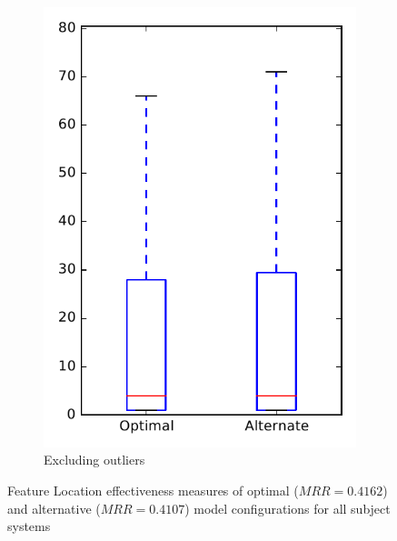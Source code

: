 \begin{figure}
\begin{subfigure}{.4\textwidth}
        \includegraphics[height=0.4\textheight]{figures/combo/flt_rq1_all_no_outlier}
        \caption{Excluding outliers}\label{fig:combo:flt:rq1:all_no_outlier}
    \end{subfigure}
\caption{Feature Location effectiveness measures of optimal ($MRR=0.4162$) and alternative ($MRR=0.4107$) model configurations for all subject systems}
\label{fig:combo:flt:rq1:all}
\end{figure}

